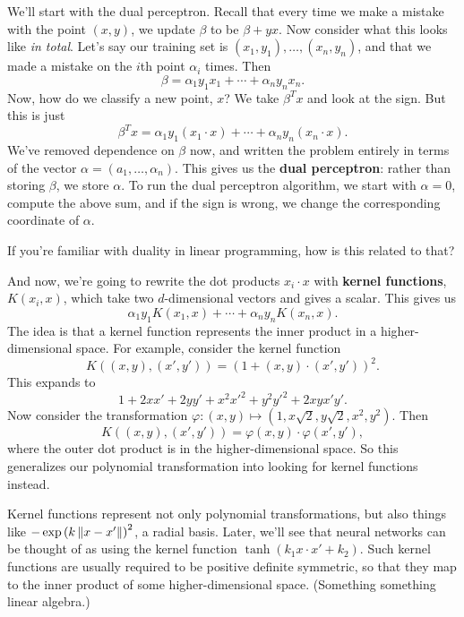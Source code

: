 \documentclass[11pt,paper=letter]{scrartcl}
\begin{document}
We'll start with the dual perceptron. Recall that every time we make a mistake with the point $(x, y)$, we update $\beta$ to be $\beta + yx$. Now consider what this looks like \textit{in total}. Let's say our training set is $(x_1, y_1), \ldots, (x_n, y_n)$, and that we made a mistake on the $i$th point $\alpha_i$ times. Then \[
  \beta = \alpha_1y_1x_1 + \cdots + \alpha_ny_nx_n.
\]
Now, how do we classify a new point, $x$? We take $\beta^Tx$ and look at the sign. But this is just \[
  \beta^Tx = \alpha_1y_1(x_1 \cdot x) + \cdots + \alpha_ny_n(x_n \cdot x).
\]
We've removed dependence on $\beta$ now, and written the problem entirely in terms of the vector $\alpha = (a_1, \ldots, \alpha_n)$. This gives us the \textbf{dual perceptron}: rather than storing $\beta$, we store $\alpha$. To run the dual perceptron algorithm, we start with $\alpha = 0$, compute the above sum, and if the sign is wrong, we change the corresponding coordinate of $\alpha$.
\begin{exrboxed}
  If you're familiar with duality in linear programming, how is this related to that?
\end{exrboxed}

And now, we're going to rewrite the dot products $x_i \cdot x$ with \textbf{kernel functions}, $K(x_i, x)$, which take two $d$-dimensional vectors and gives a scalar. This gives us \[
  \alpha_1y_1K(x_1, x) + \cdots + \alpha_ny_nK(x_n, x).
\]
The idea is that a kernel function represents the inner product in a higher-dimensional space. For example, consider the kernel function \[
  K\left((x, y), (x', y')\right) = \left(1 + (x, y) \cdot (x', y')\right)^2.
\]
This expands to \[
  1 + 2xx' + 2yy' + x^2x'^2 + y^2y'^2 + 2xyx'y'.
\]
Now consider the transformation $\varphi: (x, y) \mapsto (1, x\sqrt{2}, y\sqrt{2}, x^2, y^2)$. Then \[
  K\left((x, y), (x', y')\right) = \varphi(x, y) \cdot \varphi(x', y'),
\]
where the outer dot product is in the higher-dimensional space. So this generalizes our polynomial transformation into looking for kernel functions instead.

Kernel functions represent not only polynomial transformations, but also things like $-\exp\left(k\left\lVert x - x' \right\rVert\right)^2$, a radial basis. Later, we'll see that neural networks can be thought of as using the kernel function $\tanh\left(k_1 x \cdot x' + k_2\right)$. Such kernel functions are usually required to be positive definite symmetric, so that they map to the inner product of some higher-dimensional space. (Something something linear algebra.)
\end{document}
